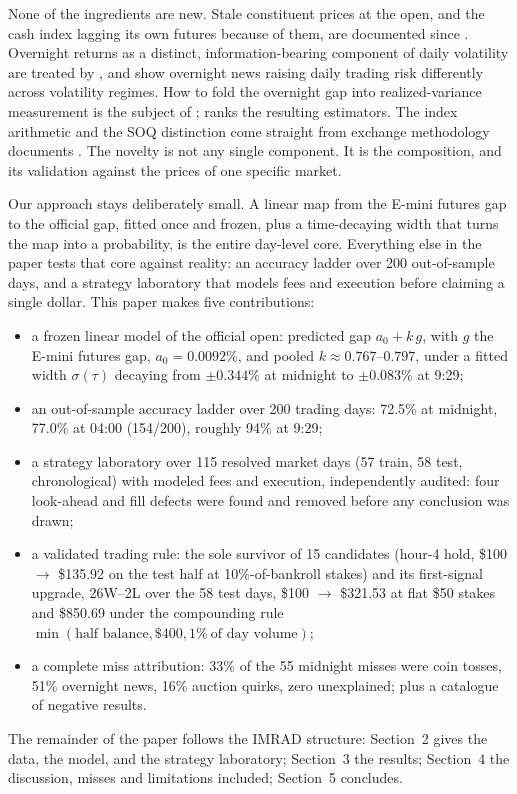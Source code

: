 None of the ingredients are new. Stale constituent prices at the open, and
the cash index lagging its own futures because of them, are documented
since \citet{stollwhaley1990}. Overnight returns as a distinct,
information-bearing component of daily volatility are treated by
\citet{ahoniemilanne2013}, and \citet{ahoniemi2016overnight} show
overnight news raising daily trading risk differently across volatility
regimes. How to fold the overnight gap into realized-variance measurement
is the subject of \citet{hansenlunde2005}; \citet{patton2011ranking}
ranks the resulting estimators. The index arithmetic and the SOQ
distinction come straight from exchange methodology documents
\citep{spdji2026indexmath,cme2026soq}. The novelty is not any single
component. It is the composition, and its validation against the prices of
one specific market.

Our approach stays deliberately small. A linear map from the E-mini futures
gap to the official gap, fitted once and frozen, plus a time-decaying width
that turns the map into a probability, is the entire day-level core.
Everything else in the paper tests that core against reality: an accuracy
ladder over 200 out-of-sample days, and a strategy laboratory that models
fees and execution before claiming a single dollar. This paper makes five
contributions:
\begin{itemize}
  \item a frozen linear model of the official open: predicted gap
    $a_0 + k\,g$, with $g$ the E-mini futures gap, $a_0 = 0.0092\%$, and
    pooled $k \approx 0.767$--$0.797$, under a fitted width
    $\sigma(\tau)$ decaying from $\pm0.344\%$ at midnight to $\pm0.083\%$
    at 9:29;
  \item an out-of-sample accuracy ladder over 200 trading days: 72.5\% at
    midnight, 77.0\% at 04:00 (154/200), roughly 94\% at 9:29;
  \item a strategy laboratory over 115 resolved market days (57 train, 58
    test, chronological) with modeled fees and execution, independently
    audited: four look-ahead and fill defects were found and removed before
    any conclusion was drawn;
  \item a validated trading rule: the sole survivor of 15 candidates
    (hour-4 hold, \$100 $\to$ \$135.92 on the test half at
    10\%-of-bankroll stakes) and its first-signal upgrade, 26W--2L over the
    58 test days, \$100 $\to$ \$321.53 at flat \$50 stakes and \$850.69
    under the compounding rule $\min(\text{half balance}, \$400,
    1\%~\text{of day volume})$;
  \item a complete miss attribution: 33\% of the 55 midnight misses were
    coin tosses, 51\% overnight news, 16\% auction quirks, zero
    unexplained; plus a catalogue of negative results.
\end{itemize}

The remainder of the paper follows the IMRAD structure: Section~2 gives the
data, the model, and the strategy laboratory; Section~3 the results;
Section~4 the discussion, misses and limitations included; Section~5
concludes.
